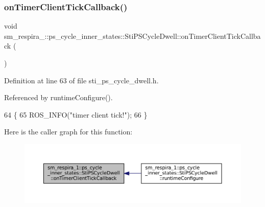 \subsubsection{\texorpdfstring{on\+Timer\+Client\+Tick\+Callback()}{onTimerClientTickCallback()}}
{\footnotesize\ttfamily void sm\+\_\+respira\+\_\+::ps\+\_\+cycle\+\_\+inner\+\_\+states\+::\+Sti\+P\+S\+Cycle\+Dwell\+::on\+Timer\+Client\+Tick\+Callback (\begin{DoxyParamCaption}{ }\end{DoxyParamCaption})\hspace{0.3cm}{\ttfamily [inline]}}



Definition at line 63 of file sti\+\_\+ps\+\_\+cycle\+\_\+dwell.\+h.



Referenced by runtime\+Configure().


\begin{DoxyCode}
64   \{
65     ROS\_INFO(\textcolor{stringliteral}{"timer client tick!"});
66   \}
\end{DoxyCode}
Here is the caller graph for this function\+:
\nopagebreak
\begin{figure}[H]
\begin{center}
\leavevmode
\includegraphics[width=350pt]{structsm__respira__1_1_1ps__cycle__inner__states_1_1StiPSCycleDwell_a01112c5545a2fcf9bf83057eb2748f73_icgraph}
\end{center}
\end{figure}
\mbox{\label{structsm__respira__1_1_1ps__cycle__inner__states_1_1StiPSCycleDwell_ac3b64b8ba4020a441f1daa5b8b01fd91}} 
